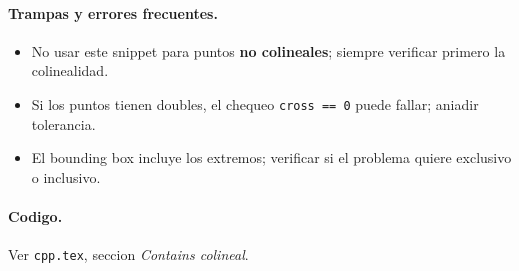 \paragraph{Trampas y errores frecuentes.}
\begin{itemize}\setlength\itemsep{0pt}
	\item No usar este snippet para puntos \textbf{no colineales}; siempre verificar primero la colinealidad.
	\item Si los puntos tienen doubles, el chequeo \texttt{cross == 0} puede fallar; aniadir tolerancia.
	\item El bounding box incluye los extremos; verificar si el problema quiere exclusivo o inclusivo.
\end{itemize}

\paragraph{Codigo.}
Ver \texttt{cpp.tex}, seccion \textit{Contains colineal}.
